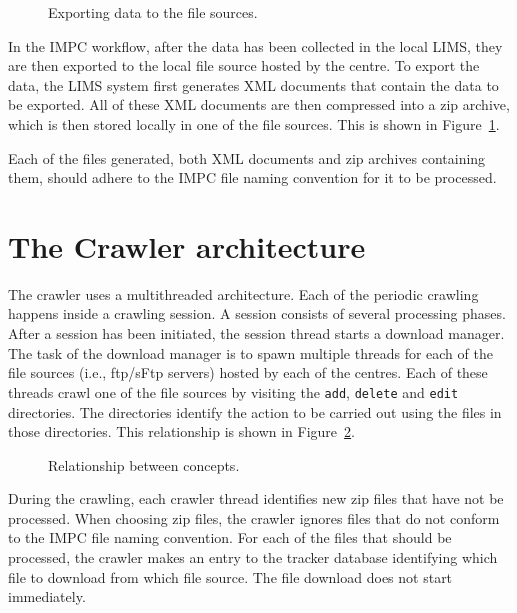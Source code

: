 \documentclass[a4paper,11pt]{article}
\begin{document}
\begin{figure}[htbp]
\centering
{}
\caption{Exporting data to the file sources.\label{fig:exporting to ftp}}
\end{figure}

In the IMPC workflow, after the data has been collected in the local LIMS, they are then exported to the local file source hosted by the centre. To export the data, the LIMS system first generates XML documents that contain the data to be exported. All of these XML documents are then compressed into a zip archive, which is then stored locally in one of the file sources. This is shown in Figure~\ref{fig:exporting to ftp}.

Each of the files generated, both XML documents and zip archives containing them, should adhere to the IMPC file naming convention for it to be processed.

\section{The Crawler architecture}

The crawler uses a multithreaded architecture. Each of the periodic crawling happens inside a crawling session. A session consists of several processing phases. After a session has been initiated, the session thread starts a download manager. The task of the download manager is to spawn multiple threads for each of the file sources (i.e., ftp/sFtp servers) hosted by each of the centres. Each of these threads crawl one of the file sources by visiting the {\tt add}, {\tt delete} and {\tt edit} directories. The directories identify the action to be carried out using the files in those directories. This relationship is shown in Figure~\ref{fig:concept relationship}.

\begin{figure}[htbp]
\centering
{}
\caption{Relationship between concepts.\label{fig:concept relationship}}
\end{figure}

During the crawling, each crawler thread identifies new zip files that have not be processed. When choosing zip files, the crawler ignores files that do not conform to the IMPC file naming convention. For each of the files that should be processed, the crawler makes an entry to the tracker database identifying which file to download from which file source. The file download does not start immediately.
\end{document}
